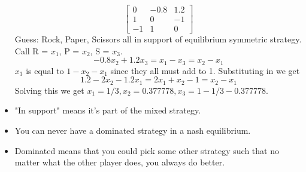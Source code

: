 \documentclass{article}
\begin{document}
\begin{itemize}
\[\begin{bmatrix}
    0 & -0.8 & 1.2 \\
    1 & 0 & -1 \\
    -1 & 1 & 0
  \end{bmatrix}\]
  Guess: Rock, Paper, Scissors all in support of equilibrium symmetric strategy. Call R = $x_1$, P = $x_2$, S = $x_3$. \[-0.8x_2+1.2x_3=x_1-x_3=x_2-x_1\]
  $x_3$ is equal to $1-x_2-x_1$ since they all must add to 1. Substituting in we get \[1.2-2x_2-1.2x_1=2x_1+x_2-1=x_2-x_1\]
  Solving this we get $x_1=1/3, x_2=0.377778, x_3=1-1/3-0.377778$.
  \item "In support" means it's part of the mixed strategy.
  \item You can never have a dominated strategy in a nash equilibrium.
  \item Dominated means that you could pick some other strategy such that no matter what the other player does, you always do better.
\end{itemize}
\end{document}
